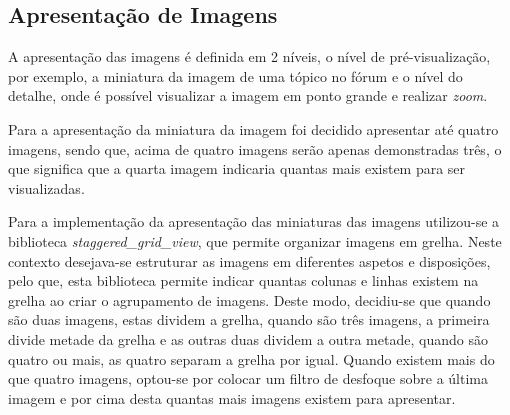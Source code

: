 \subsection{Apresentação de Imagens}
A apresentação das imagens é definida em 2 níveis, o nível de pré-visualização, por exemplo, a miniatura da imagem de uma tópico no fórum e o nível do detalhe, onde é possível visualizar a imagem em ponto grande e realizar \textit{zoom}.

Para a apresentação da miniatura da imagem foi decidido apresentar até quatro imagens, sendo que, acima de quatro imagens serão apenas demonstradas três, o que significa que a quarta imagem indicaria quantas mais existem para ser visualizadas. 

Para a implementação da apresentação das miniaturas das imagens utilizou-se a biblioteca \textit{staggered\_grid\_view}, que permite organizar imagens em grelha. Neste contexto desejava-se estruturar as imagens em diferentes aspetos e disposições, pelo que, esta biblioteca permite indicar quantas colunas e linhas existem na grelha ao criar o agrupamento de imagens. Deste modo, decidiu-se que quando são duas imagens, estas dividem a grelha, quando são três imagens, a primeira divide metade da grelha e as outras duas dividem a outra metade, quando são quatro ou mais, as quatro separam a grelha por igual. Quando existem mais do que quatro imagens, optou-se por colocar um filtro de desfoque sobre a última imagem e por cima desta quantas mais imagens existem para apresentar.

